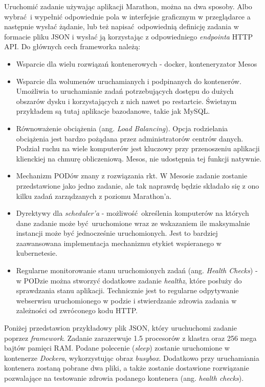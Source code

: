 \documentclass[10pt,a4paper,titlepage,twoside]{report}
\begin{document}
Uruchomić zadanie używając aplikacji Marathon, można na dwa sposoby. Albo wybrać i wypełnić odpowiednie pola w interfejsie graficznym w przeglądarce a następnie wysłać żądanie, lub też napisać odpowiednią definicję zadania w formacie pliku JSON i wysłać ją korzystając z odpowiedniego \textit{endpointa} HTTP API.
Do głównych cech frameworka należą:
\begin{itemize}
\item Wsparcie dla wielu rozwiązań kontenerowych - docker, konteneryzator Mesos
\item Wsparcie dla wolumenów uruchamianych i podpinanych do kontenerów. Umożliwia to uruchamianie zadań potrzebujących dostępu do dużych obszarów dysku i korzystających z nich nawet po restartcie. Świetnym przykładem są tutaj aplikacje bazodanowe, takie jak MySQL.
\item Równoważenie obciążenia (ang. \textit{Load Balancing}). Opcja rodzielania obciążenia jest bardzo pożądana przez administratorów centrów danych. Podział ruchu na wiele komputerów jest kluczowy przy przenoszeniu aplikacji klienckiej na chmurę obliczeniową. Mesos, nie udostępnia tej funkcji natywnie.
\item Mechanizm PODów znany z rozwiązania rkt. W Mesosie zadanie zostanie przedstawione jako jedno zadanie, ale tak naprawdę będzie składało się z ono kilku zadań zarządzanych z poziomu Marathon'a.
\item Dyrektywy dla \textit{scheduler'a} - możliwość określenia komputerów na których dane zadanie może być uruchomione wraz ze wskazaniem ile maksymalnie instancji może być jednocześnie uruchomionych. Jest to bardziej zaawansowana implementacja mechanizmu etykiet wspieranego w kubernetesie.
\item Regularne monitorowanie stanu uruchomionych zadań (ang. \textit{Health Checks}) - w PODzie można stworzyć dodatkowe zadanie \textit{healthz}, które posłuży do sprawdzania stanu aplikacji. Technicznie jest to regularne odpytywanie webserwisu uruchomionego w podzie i stwierdzanie zdrowia zadania w zależności od zwróconego kodu HTTP.
\end{itemize}

Poniżej przedstawion przykładowy plik JSON, który uruchuchomi zadanie poprzez \textit{framework}. Zadanie zarazerwuje 1.5 procesorów z klastra oraz 256 mega bajtów pamięci RAM. Podane polecenie (\textit{sleep}) zostanie uruchomione w kontenerze \textit{Dockera}, wykorzystując obraz \textit{busybox}. Dodatkowo przy uruchamiania kontenera zostaną pobrane dwa pliki, a także zostanie dostawione rozwiązanie pozwalające na testowanie zdrowia podanego kontenera (ang. \textit{health checks}). 
\end{document}
